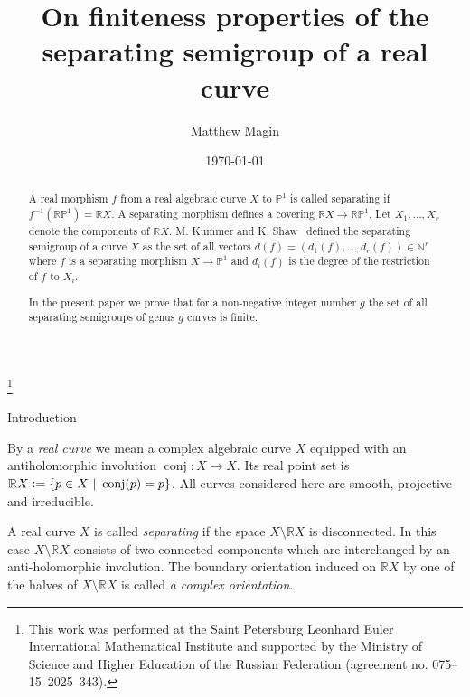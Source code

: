 \documentclass[x11names,oneside,11pt]{amsart}
\makeatletter
\theoremstyle{definition}
\theoremstyle{remark}
\DeclareMathOperator{\conj}{conj}
\newcommand{\eqdef}{\vcentcolon=}
\newcommand{\N}{\mathbb{N}}
\newcommand{\R}{\mathbb{R}}
\newcommand{\PP}{\mathbb{P}}
\renewcommand{\section}{%
  \@startsection{section}{1}%
    \z@{.7\linespacing\@plus\linespacing}{.5\linespacing}%
    {\normalfont\bfseries\centering}%
}
\makeatother
\begin{document}
   
   \title[On finiteness properties of the separating semigroup of a real curve]{On finiteness properties of the separating semigroup of a real curve}

  \author{Matthew Magin}

  \date{\today}

  \address{Matthew Magin: Saint Petersburg University, 7/9 Universitetskaya nab., St. Petersburg, 199034 Russia}


  \thanks{This work was performed at the Saint Petersburg Leonhard Euler International Mathematical Institute and supported by the Ministry of Science and Higher Education of the Russian Federation (agreement no. 075–15–2025–343).}

  \begin{abstract}
  A real morphism $f$ from a real algebraic curve $X$ to $\PP^1$ is called separating if $f^{-1}(\R \PP^1) = \R X$. A separating morphism defines a covering $\R X \to \R \PP^1$. Let $X_1, \ldots, X_r$ denote the components of $\R X$. M. Kummer and K. Shaw~\cite{kummer_separating_2020} defined the separating semigroup of a curve $X$ as the set of all vectors $d(f) = (d_1(f), \ldots, d_r(f)) \in \N^{r}$ where $f$ is a separating morphism $X \to \PP^1$ and $d_i(f)$ is the degree of the restriction of $f$ to $X_i$. 
  
  In the present paper we prove that for a non-negative integer number $g$ the set of all separating semigroups of genus $g$ curves is finite. 
  \end{abstract}
  


  \maketitle

  \section{Introduction}
  
  By a \emph{real curve} we mean a complex algebraic curve $X$ equipped with an antiholomorphic involution $\conj\colon X \to X$. Its real point set is $\R X \eqdef \{ p \in X \ \vert \ \conj(p)=p\}$. All curves considered here are smooth, projective and irreducible. 
  
  \medskip 
  
  A real curve $X$ is called \emph{separating} if the space $X \setminus \R X$ is disconnected. In this case $X \setminus \R X$ consists of two connected components which are interchanged by an anti-holomorphic involution. The boundary orientation induced on $\R X$ by one of the halves of $X \setminus \R X$ is called {\em a complex orientation}. 
  
\end{document}
